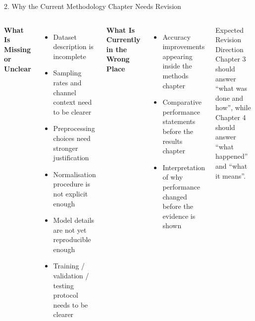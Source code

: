 \documentclass[aspectratio=169, 11pt]{beamer}
\begin{document}
\begin{frame}[shrink=7]{2. Why the Current Methodology Chapter Needs Revision}

    \begin{columns}[T]
        \textbf{What Is Missing or Unclear}
        \begin{itemize}
            \item Dataset description is incomplete
            \item Sampling rates and channel context need to be clearer
            \item Preprocessing choices need stronger justification
            \item Normalisation procedure is not explicit enough
            \item Model details are not yet reproducible enough
            \item Training / validation / testing protocol needs to be clearer
        \end{itemize}

        \textbf{What Is Currently in the Wrong Place}
        \begin{itemize}
            \item Accuracy improvements appearing inside the methods chapter
            \item Comparative performance statements before the results chapter
            \item Interpretation of why performance changed before the evidence is shown
        \end{itemize}

        \vspace{2mm}
        \begin{alertblock}{Expected Revision Direction}
            Chapter 3 should answer ``what was done and how'', while Chapter 4 should answer ``what happened'' and ``what it means''.
        \end{alertblock}
    \end{columns}
\end{frame}
\end{document}
